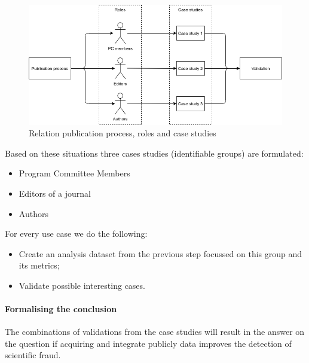 \documentclass{ou-report}
\begin{document}
\begin{figure}[H]
\centering
\includegraphics[width=13cm]{images/research_method/research_method.png}
\caption{Relation publication process, roles and case studies}
\label{fig:research_method}
\end{figure}
Based on these situations three cases studies (identifiable groups) are formulated:
\begin{itemize}
    \item Program Committee Members
    \item Editors of a journal
    \item Authors
\end{itemize}

For every use case we do the following:
\begin{itemize}
    \item Create an analysis dataset from the previous step focussed on
    this group and its metrics;
    \item Validate possible interesting cases.
\end{itemize}



\paragraph{Formalising the conclusion}
The combinations of validations from the case studies will result in the
answer on the question if acquiring and integrate publicly data improves
the detection of scientific fraud.
\end{document}
